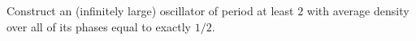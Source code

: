 \begin{multicols}{2}
	
	\mfilbreak
	
	
	\begin{problem}\label{exer:dense_oscillator} 
		Construct an (infinitely large) oscillator of period at least $2$ with average density over all of its phases equal to exactly $1/2$.
	\end{problem}
	
\end{multicols}
\normalsize\vspace*{0.01cm}
